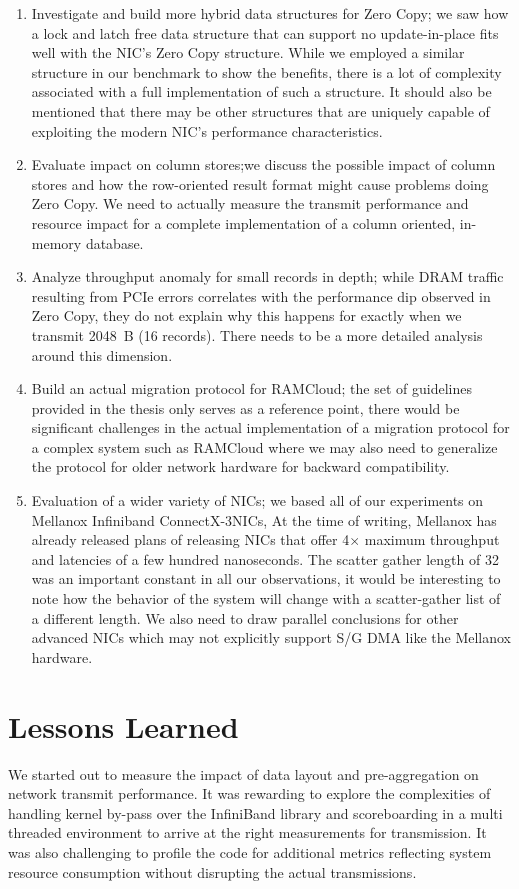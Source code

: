 \begin{enumerate}
\item Investigate and build more hybrid data structures for Zero Copy; we saw how a lock and latch free data structure that can support no update-in-place 
fits well with the NIC's Zero Copy structure. While we employed a similar structure in our benchmark to show the benefits, there is a lot of complexity associated 
with a full implementation of such a structure. It should also be mentioned that there may be other structures that are uniquely capable of exploiting the modern NIC's 
performance characteristics.
\item Evaluate impact on column stores;we discuss the possible impact of column stores and how the row-oriented result format might cause problems doing Zero Copy. We need 
to actually measure the transmit performance and resource impact for a complete implementation of a column oriented, in-memory database.
\item Analyze throughput anomaly for small records in depth; while DRAM traffic resulting from PCIe errors correlates with the performance dip observed in Zero Copy, 
they do not explain why this happens for exactly when we transmit 2048~B (16 records). There needs to be a more detailed analysis around this dimension.
\item Build an actual migration protocol for RAMCloud; the set of guidelines provided in the thesis only serves as a reference point, there would be significant challenges 
in the actual implementation of a migration protocol for a complex system such as RAMCloud where we may also need to generalize the protocol for older network hardware for backward 
compatibility.
\item Evaluation of a wider variety of NICs; we based all of our experiments on Mellanox Infiniband ConnectX-3\textregistered NICs, At the time of writing, Mellanox has already 
released plans of releasing NICs that offer 4$\times$ maximum throughput and latencies of a few hundred nanoseconds. The scatter gather length of 32 was an important constant in 
all our observations, it would be interesting to note how the behavior of the system will change with a scatter-gather list of a different length. We also need to draw parallel 
conclusions for other advanced NICs which may not explicitly support S/G DMA like the Mellanox hardware.
\end{enumerate}

\section{Lessons Learned}
We started out to measure the impact of data layout and pre-aggregation on network transmit performance. 
It was rewarding to explore the complexities of handling kernel by-pass over the InfiniBand library and 
scoreboarding in a multi threaded environment to arrive at the right measurements for transmission.
It was also challenging to profile the code for additional metrics reflecting system resource consumption 
without disrupting the actual transmissions. 

